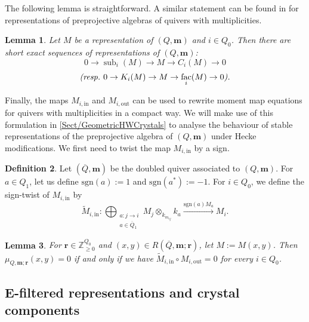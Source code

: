 \documentclass[a4paper,12pt]{article}
\theoremstyle{definition}
\newtheorem{definition}{Definition}[section]
\theoremstyle{plain}
\newtheorem{lemma}[definition]{Lemma}
\theoremstyle{remark}
\DeclareMathOperator{\fac}{fac}
\DeclareMathOperator{\sub}{sub}
\newcommand\bbZ{\mathbb{Z}}
\newcommand\bfm{\mathbf{m}}
\newcommand\bfr{\mathbf{r}}
\begin{document}
The following lemma is straightforward. A similar statement can be found in \cite[\S 4.2]{GLS18a} for representations of preprojective algebras of quivers with multiplicities.

\begin{lemma}\label{Lem/propertiesK_iC_i}
Let $M$ be a representation of $(Q,\bfm)$ and $i\in Q_0$. Then there are short exact sequences of representations of $(Q,\bfm)$:
\[
0\rightarrow \sub_i(M)\rightarrow M\rightarrow C_i(M)\rightarrow 0
\]
\[
\emph{(resp.\ }
0\rightarrow K_i(M)\rightarrow M\rightarrow \fac_i(M)\rightarrow 0
\emph{).}
\]
\end{lemma}

Finally, the maps $M_{i,\mathrm{in}}$ and $M_{i,\mathrm{out}}$ can be used to rewrite moment map equations for quivers with multiplicities in a compact way. We will make use of this formulation in \cref{Sect/GeometricHWCrystals} to analyse the behaviour of stable representations of the preprojective algebra of $(Q,\bfm)$ under Hecke modifications. We first need to twist the map $M_{i,\mathrm{in}}$ by a sign.

\begin{definition}\label{def/signTwistedM_i,in}
Let $(\overline{Q},\bfm)$ be the doubled quiver associated to $(Q,\bfm)$. For $a\in Q_1$, let us define $\mathrm{sgn}(a):=1$ and $\mathrm{sgn}(a^*):=-1$. For $i\in Q_0$, we define the sign-twist of $M_{i,\mathrm{in}}$ by
\[
\widetilde{M}_{i,\mathrm{in}}\colon\bigoplus_{\substack{a:j\rightarrow i \\ a\in\overline{Q}_1}}M_j\otimes_{k_{m_{ij}}}k_a\overset{\mathrm{sgn}(a)M_a}{\longrightarrow} M_i
.
\]
\end{definition}

\begin{lemma}\label{Lem/momentMapEqn}
\emph{\cite[Prop.\ 5.2]{GLS17a}} For $\bfr\in\bbZ_{\geq0}^{Q_0}$ and $(x,y)\in R(\overline{Q},\bfm;\bfr)$, let $M:=M(x,y)$. Then $\mu_{Q,\bfm;\bfr}(x,y)=0$ if and only if  we have $\widetilde{M}_{i,\mathrm{in}}\circ M_{i,\mathrm{out}}=0$ for every $i\in Q_0$.
\end{lemma}

\subsection{E-filtered representations and crystal components}\label{Sect/CrystalComponents}
\end{document}
